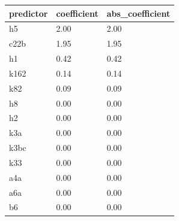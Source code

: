 \begin{tabular}{lll}
\toprule
predictor & coefficient & abs\_coefficient \\
\midrule
h5 & 2.00 & 2.00 \\
c22b & 1.95 & 1.95 \\
h1 & 0.42 & 0.42 \\
k162 & 0.14 & 0.14 \\
k82 & 0.09 & 0.09 \\
h8 & 0.00 & 0.00 \\
h2 & 0.00 & 0.00 \\
k3a & 0.00 & 0.00 \\
k3bc & 0.00 & 0.00 \\
k33 & 0.00 & 0.00 \\
a4a & 0.00 & 0.00 \\
a6a & 0.00 & 0.00 \\
b6 & 0.00 & 0.00 \\
\bottomrule
\end{tabular}
